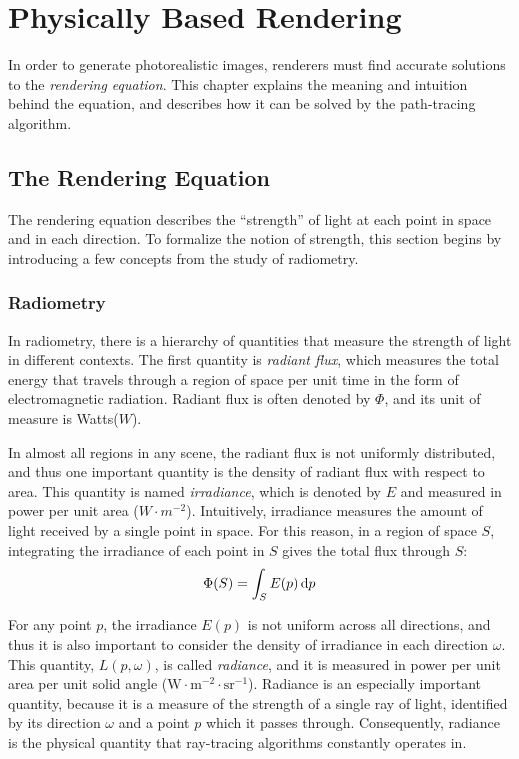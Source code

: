\chapter{Physically Based Rendering}

In order to generate photorealistic images, renderers must find accurate solutions to the \textit{rendering equation}. This chapter explains the meaning and intuition behind the equation, and describes how it can be solved by the path-tracing algorithm.

\section{The Rendering Equation}

The rendering equation describes the ``strength'' of light at each point in space and in each direction. To formalize the notion of strength, this section begins by introducing a few concepts from the study of radiometry.

\subsection{Radiometry}

In radiometry, there is a hierarchy of quantities that measure the strength of light in different contexts. The first quantity is \textit{radiant flux}, which measures the total energy that travels through a region of space per unit time in the form of electromagnetic radiation. Radiant flux is often denoted by $\Phi$, and its unit of measure is Watts($W$). 

In almost all regions in any scene, the radiant flux is not uniformly distributed, and thus one important quantity is the density of radiant flux with respect to area. This quantity is named \textit{irradiance}, which is denoted by $E$ and measured in power per unit area ($W\cdot m^{-2}$). Intuitively, irradiance measures the amount of light received by a single point in space. For this reason, in a region of space $S$, integrating the irradiance of each point in $S$ gives the total flux through $S$:
\begin{align}
    \Phi(S) = \int_S E(p) \,\mathrm{d} p 
    \label{irradiance integral}
\end{align}

For any point $p$, the irradiance $E(p)$ is not uniform across all directions, and thus it is also important to consider the density of irradiance in each direction $\omega$. This quantity, $L(p,\omega)$, is called \textit{radiance}, and it is measured in power per unit area per unit solid angle ($\text{W}\cdot\text{m}^{-2}\cdot \text{sr}^{-1}$). Radiance is an especially important quantity, because it is a measure of the strength of a single ray of light, identified by its direction $\omega$ and a point $p$ which it passes through. Consequently, radiance is the physical quantity that ray-tracing algorithms constantly operates in. 


